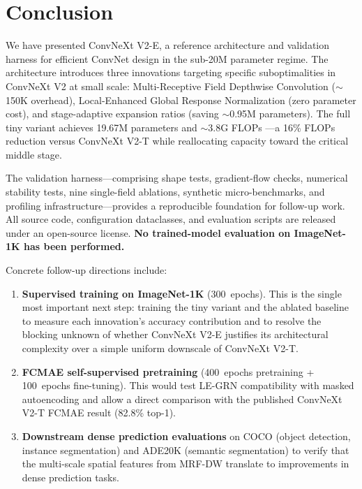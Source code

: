 \documentclass{article}
\begin{document}
\section{Conclusion}
\label{sec:conclusion}

We have presented ConvNeXt V2-E, a reference architecture and
validation harness for efficient ConvNet design in the sub-20M
parameter regime.  The architecture introduces three innovations
targeting specific suboptimalities in ConvNeXt V2 at small scale:
Multi-Receptive Field Depthwise Convolution ($\sim$150K overhead),
Local-Enhanced Global Response Normalization (zero parameter cost),
and stage-adaptive expansion ratios (saving $\sim$0.95M parameters).
The full tiny variant achieves 19.67M parameters and $\sim$3.8G FLOPs
---a 16\% FLOPs reduction versus ConvNeXt V2-T while reallocating
capacity toward the critical middle stage.

The validation harness---comprising shape tests, gradient-flow checks,
numerical stability tests, nine single-field ablations, synthetic
micro-benchmarks, and profiling infrastructure---provides a
reproducible foundation for follow-up work.  All source code,
configuration dataclasses, and evaluation scripts are released under an
open-source license.  \textbf{No trained-model evaluation on
ImageNet-1K has been performed.}

Concrete follow-up directions include:

\begin{enumerate}[nosep]
  \item \textbf{Supervised training on ImageNet-1K} (300~epochs).
        This is the single most important next step: training the tiny
        variant and the ablated baseline to measure each innovation's
        accuracy contribution and to resolve the blocking unknown of
        whether ConvNeXt V2-E justifies its architectural complexity
        over a simple uniform downscale of ConvNeXt V2-T.
  \item \textbf{FCMAE self-supervised pretraining} (400~epochs
        pretraining + 100~epochs fine-tuning).  This would test LE-GRN
        compatibility with masked autoencoding and allow a
        direct comparison with the published ConvNeXt V2-T FCMAE
        result (82.8\% top-1).
  \item \textbf{Downstream dense prediction evaluations} on COCO
        (object detection, instance segmentation) and ADE20K (semantic
        segmentation) to verify that the multi-scale spatial features
        from MRF-DW translate to improvements in dense prediction
        tasks.
\end{enumerate}
\end{document}
